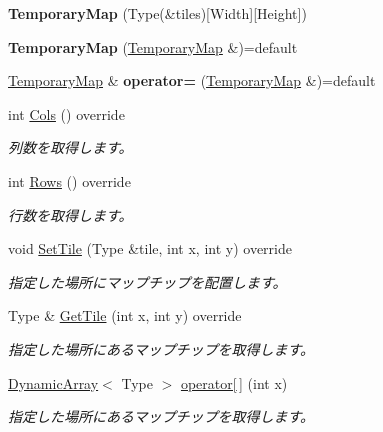 \begin{DoxyCompactItemize}
\item 
{\bfseries Temporary\+Map} (Type(\&tiles)\mbox{[}Width\mbox{]}\mbox{[}Height\mbox{]})\hypertarget{class_temporary_map_a862c45a782b45169bee29a00d3eb53ac}{}\label{class_temporary_map_a862c45a782b45169bee29a00d3eb53ac}

\item 
{\bfseries Temporary\+Map} (\hyperlink{class_temporary_map}{Temporary\+Map} \&)=default\hypertarget{class_temporary_map_ab2dac2640fe02f987c8a011d43d5a10d}{}\label{class_temporary_map_ab2dac2640fe02f987c8a011d43d5a10d}

\item 
\hyperlink{class_temporary_map}{Temporary\+Map} \& {\bfseries operator=} (\hyperlink{class_temporary_map}{Temporary\+Map} \&)=default\hypertarget{class_temporary_map_ac96bf13a06b9825e8901a08f19b4c3da}{}\label{class_temporary_map_ac96bf13a06b9825e8901a08f19b4c3da}

\item 
int \hyperlink{class_temporary_map_af7fce728f271905270d2cd4ee3c149d0}{Cols} () override
\begin{DoxyCompactList}\small\item\em 列数を取得します。\end{DoxyCompactList}\item 
int \hyperlink{class_temporary_map_a183900f63c890c2745fcfddd1283c4c6}{Rows} () override
\begin{DoxyCompactList}\small\item\em 行数を取得します。\end{DoxyCompactList}\item 
void \hyperlink{class_temporary_map_a6e89bbdc050b0ef5e5f89ef27ccb29e3}{Set\+Tile} (Type \&tile, int x, int y) override
\begin{DoxyCompactList}\small\item\em 指定した場所にマップチップを配置します。\end{DoxyCompactList}\item 
Type \& \hyperlink{class_temporary_map_a86dcb37a20d333785aa6e972aa1681eb}{Get\+Tile} (int x, int y) override
\begin{DoxyCompactList}\small\item\em 指定した場所にあるマップチップを取得します。\end{DoxyCompactList}\item 
\hyperlink{class_dynamic_array}{Dynamic\+Array}$<$ Type $>$ \hyperlink{class_temporary_map_a9feb889f2e8b6835e244823cc6e4786f}{operator\mbox{[}$\,$\mbox{]}} (int x)
\begin{DoxyCompactList}\small\item\em 指定した場所にあるマップチップを取得します。\end{DoxyCompactList}\end{DoxyCompactItemize}


